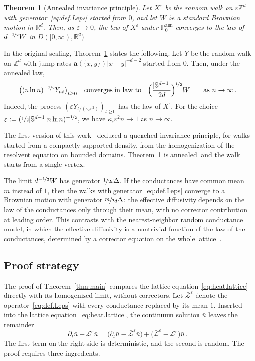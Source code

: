 \documentclass[11pt]{amsart}
\newtheorem{theorem}{Theorem}[section]
\numberwithin{equation}{section}
\newcommand{\Z}{\mathbb{Z}}
\newcommand{\R}{\mathbb{R}}
\newcommand{\PP}{\mathbb{P}}
\newcommand{\ba}{\mathbf{a}}
\newcommand{\eps}{\varepsilon}
\newcommand{\Leps}{\mathcal{L}^\varepsilon}
\newcommand{\Lbar}{\bar{\mathcal{L}}^\varepsilon}
\newcommand{\nf}{\nicefrac}
\begin{document}
\begin{theorem}[Annealed invariance principle] \label{thm:IP}
Let $X^\eps$ be the random walk on $\eps \Z^d$ with generator~\eqref{eq:def.Leps} started from $0$, and let $W$ be a standard Brownian motion in $\R^d$.
Then, as $\eps \to 0$, the law of $X^\eps$ under $\PP^{\mathrm{ann}}_0$ converges to the law of $d^{-\nf12} W$ in $D([0, \infty), \R^d)$.
\end{theorem}

In the original scaling, Theorem~\ref{thm:IP} states the following.
Let $Y$ be the random walk on $\Z^d$ with jump rates $\ba(\{x,y\}) |x-y|^{-d-2}$ started from $0$.
Then, under the annealed law,
\begin{equation*}
    \bigl( (n \ln n)^{-\nf12} Y_{nt} \bigr)_{t \geq 0} \quad \text{converges in law to} \quad \Bigl( \frac{|\mathbb{S}^{d-1}|}{2d} \Bigr)^{\nf12} W \qquad \text{as } n \to \infty\,.
\end{equation*}
Indeed, the process $(\eps Y_{t/(\kappa_\eps \eps^2)})_{t \geq 0}$ has the law of $X^\eps$.
For the choice $\eps := (\nf12 |\mathbb{S}^{d-1}| n \ln n)^{-\nf12}$, we have $\kappa_\eps \eps^2 n \to 1$ as $n \to \infty$.

The first version of this work~\citep{BD2026} deduced a quenched invariance principle, for walks started from a compactly supported density, from the homogenization of the resolvent equation on bounded domains.
Theorem~\ref{thm:IP} is annealed, and the walk starts from a single vertex.

The limit $d^{-\nf12} W$ has generator $\nf{1}{2d} \Delta$.
If the conductances have common mean $m$ instead of $1$, then the walks with generator~\eqref{eq:def.Leps} converge to a Brownian motion with generator $\nf{m}{2d} \Delta$: the effective diffusivity depends on the law of the conductances only through their mean, with no corrector contribution at leading order.
This contrasts with the nearest-neighbor random conductance model, in which the effective diffusivity is a nontrivial function of the law of the conductances, determined by a corrector equation on the whole lattice~\citep{Kozlov1979, PapanicolaouVaradhan1981}.

\subsection{Proof strategy}

The proof of Theorem~\ref{thm:main} compares the lattice equation~\eqref{eq:heat.lattice} directly with its homogenized limit, without correctors.
Let $\Lbar$ denote the operator~\eqref{eq:def.Leps} with every conductance replaced by its mean $1$.
Inserted into the lattice equation~\eqref{eq:heat.lattice}, the continuum solution $\bar u$ leaves the remainder
\begin{equation} \label{eq:splitting}
    \partial_t \bar u - \Leps \bar u = \bigl( \partial_t \bar u - \Lbar \bar u \bigr) + \bigl( \Lbar - \Leps \bigr) \bar u\,.
\end{equation}
The first term on the right side is deterministic, and the second is random.
The proof requires three ingredients.
\end{document}
